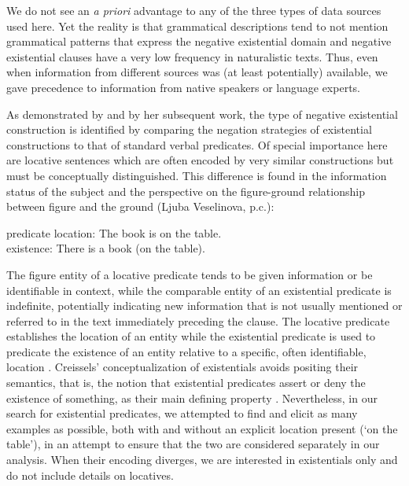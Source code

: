 \documentclass[output=paper,colorlinks,citecolor=brown]{langscibook}
\begin{document}
We do not see an \textit{a priori} advantage to any of the three types of data
sources used here. Yet the reality is that grammatical descriptions tend to
not mention grammatical patterns that express the negative existential
domain and negative existential clauses have a very low frequency in
naturalistic texts. Thus, even when information from different sources was
(at least potentially) available, we gave precedence to information from
native speakers or language experts.  

As demonstrated by \citet[112ff]{Veselinova2013} and by her subsequent
work, the type of negative existential construction is identified by
comparing the
negation strategies of existential constructions to that of standard verbal
predicates. Of special importance here are locative sentences which are
often encoded by very similar constructions but must be conceptually
distinguished. This difference is found in the information status of the
subject and the perspective on the figure-ground relationship between
figure and the ground (Ljuba Veselinova, p.c.\citealt{Creissels2013ieur}):
%
\begin{exe}\ex\label{ex:ieur-book-on-the-table}
predicate location: The book is on the table.\\
existence: There is a book (on the table).
    \end{exe}
%
The figure entity of a locative predicate tends to be given information or
be identifiable in context, while the comparable entity of an existential
predicate is indefinite, potentially indicating new information that is not
usually mentioned or referred to in the text immediately preceding the
clause. The locative predicate establishes the location of an entity while
the existential predicate is used to predicate the existence of an entity
relative to a specific, often identifiable, location \citep{Creissels2013ieur}.
Creissels' \citeyearpar{Creissels2013ieur} conceptualization of existentials avoids positing
their semantics, that is, the notion that existential predicates assert or
deny the existence of something, as their main defining property
\parencite[6ff]{Creissels2013ieur}. Nevertheless, in our search for existential
predicates, we attempted to find and elicit as many examples as possible,
both with and without an explicit location present (`on the table'), in an
attempt to ensure that the two are considered separately in our analysis.
When their encoding diverges, we are interested in existentials only and do
not include details on locatives. 
\end{document}
